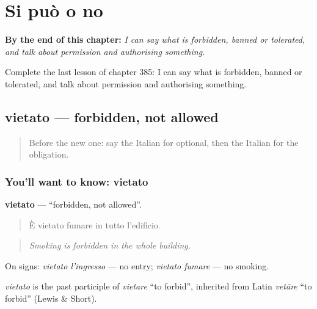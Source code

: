 
\chapter{Si può o no}
\label{ch:it-si-puo-o-no}

\begin{chapteropening}
\textbf{By the end of this chapter:} \emph{I can say what is forbidden, banned or tolerated, and talk about permission and authorising something.}

Complete the last lesson of chapter 385: I can say what is forbidden, banned or tolerated, and talk about permission and authorising something.
\end{chapteropening}

\section[vietato]{vietato — forbidden, not allowed}

\label{lesson:IT-C385-vietato}



\begin{quote}
Before the new one: say the Italian for optional, then the Italian for the obligation.
\end{quote}

\subsection*{You'll want to know: vietato}
\textbf{vietato} — \textquotedblleft{}forbidden, not allowed\textquotedblright{}.

\begin{quote}
È vietato fumare in tutto l'edificio.
\end{quote}

\begin{quote}
\emph{Smoking is forbidden in the whole building.}
\end{quote}

On signs: \emph{vietato l'ingresso} — no entry; \emph{vietato fumare} — no smoking.

\begin{cousinweb}
\emph{vietato} is the past participle of \emph{vietare} \textquotedblleft{}to forbid\textquotedblright{}, inherited from Latin \emph{vetāre} \textquotedblleft{}to forbid\textquotedblright{} (Lewis \& Short).
\end{cousinweb}

